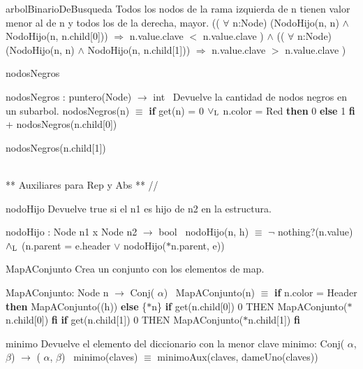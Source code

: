 \begin{DoxyParagraph}{arbol\+Binario\+De\+Busqueda}
Todos los nodos de la rama izquierda de n tienen valor menor al de n y todos los de la derecha, mayor. (( $\forall$ n\textquotesingle{}\+:Node) (Nodo\+Hijo(n\textquotesingle{}, n) $\land$ Nodo\+Hijo(n\textquotesingle{}, n.\+child\mbox{[}0\mbox{]})) $\Rightarrow$ n\textquotesingle{}.value.\+clave $<$ n.\+value.\+clave ) $\land$ (( $\forall$ n\textquotesingle{}\+:Node) (Nodo\+Hijo(n\textquotesingle{}, n) $\land$ Nodo\+Hijo(n\textquotesingle{}, n.\+child\mbox{[}1\mbox{]})) $\Rightarrow$ n\textquotesingle{}.value.\+clave $>$ n.\+value.\+clave )
\end{DoxyParagraph}
\begin{DoxyParagraph}{nodos\+Negros}


nodos\+Negros \+: puntero(\+Node) $\to$ int~\newline
 Devuelve la cantidad de nodos negros en un subarbol. nodos\+Negros(n) $\equiv$ {\bfseries if} get(n) = 0 $\lor_{\rm L}$ n.\+color = Red {\bfseries then} 0 {\bfseries else} 1 {\bfseries fi} + nodos\+Negros(n.\+child\mbox{[}0\mbox{]})
\begin{DoxyItemize}
\item nodos\+Negros(n.\+child\mbox{[}1\mbox{]}) 
\end{DoxyItemize}
\end{DoxyParagraph}


\begin{DoxyVerb}\\ ** Auxiliares para Rep y Abs ** //
\end{DoxyVerb}


\begin{DoxyParagraph}{nodo\+Hijo}
Devuelve true si el n1 es hijo de n2 en la estructura.

nodo\+Hijo \+: Node n1 x Node n2 $\to$ bool~\newline
 nodo\+Hijo(n, h) $\equiv$ $\lnot$ nothing?(n.\+value) $\land_{\rm L}$ (n.\+parent = e.\+header $\lor$ nodo\+Hijo($\ast$n.parent, e)) 
\end{DoxyParagraph}


\begin{DoxyParagraph}{Map\+A\+Conjunto}
Crea un conjunto con los elementos de map.

Map\+A\+Conjunto\+: Node n $\to$ Conj( $\alpha$)~\newline
 Map\+A\+Conjunto(n) $\equiv$ {\bfseries if} n.\+color = Header {\bfseries then} Map\+A\+Conjunto((h)) {\bfseries else} \{$\ast$n\}  {\bfseries if} get(n.\+child\mbox{[}0\mbox{]})  0 T\+H\+EN Map\+A\+Conjunto($\ast$n.child\mbox{[}0\mbox{]}) {\bfseries fi}  {\bfseries if} get(n.\+child\mbox{[}1\mbox{]})  0 T\+H\+EN Map\+A\+Conjunto($\ast$n.child\mbox{[}1\mbox{]}) {\bfseries fi} 


\end{DoxyParagraph}
\begin{DoxyParagraph}{minimo}
Devuelve el elemento del diccionario con la menor clave minimo\+: Conj( $\alpha$, $\beta$) $\to$ ( $\alpha$, $\beta$)~\newline
 minimo(claves) $\equiv$ minimo\+Aux(claves, dame\+Uno(claves)) 
\end{DoxyParagraph}


